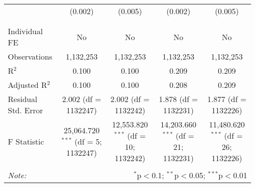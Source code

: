 \documentclass[
]{article}
\begin{document}
\begin{table}[!htbp]
{\begin{tabular}{@{\extracolsep{5pt}}lcccc}
  & (0.002) & (0.005) & (0.002) & (0.005) \\ 
  & & & & \\ 
\hline \\[-1.8ex] 
Individual FE & No & No & No & No \\ 
Observations & 1,132,253 & 1,132,253 & 1,132,253 & 1,132,253 \\ 
R$^{2}$ & 0.100 & 0.100 & 0.209 & 0.209 \\ 
Adjusted R$^{2}$ & 0.100 & 0.100 & 0.208 & 0.209 \\ 
Residual Std. Error & 2.002 (df = 1132247) & 2.002 (df = 1132242) & 1.878 (df = 1132231) & 1.877 (df = 1132226) \\ 
F Statistic & 25,064.720$^{***}$ (df = 5; 1132247) & 12,553.820$^{***}$ (df = 10; 1132242) & 14,203.660$^{***}$ (df = 21; 1132231) & 11,480.620$^{***}$ (df = 26; 1132226) \\ 
\hline 
\hline \\[-1.8ex] 
\textit{Note:}  & \multicolumn{4}{r}{$^{*}$p$<$0.1; $^{**}$p$<$0.05; $^{***}$p$<$0.01} \\ 
\end{tabular}
} 
\end{table} 
\newpage
\end{document}
